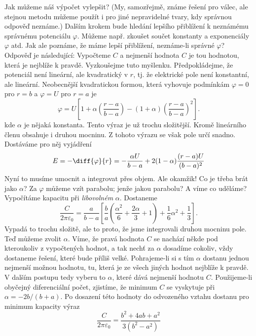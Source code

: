    Jak můžeme náš výpočet vylepšit? (My, samozřejmě, známe řešení pro válec, ale stejnou metodu
    můžeme použít i pro jiné nepravidelné tvary, kdy správnou odpověď neznáme.) Dalším krokem bude
    hledání lepšího přiblížení k neznámému správnému potenciálu \(\varphi\). Můžeme např. zkoušet
    součet konstanty a exponenciály \(\varphi\) atd. Jak ale poznáme, že máme lepší přiblížení,
    neznáme-li správné \(\varphi\)? Odpověď je následující: Vypočteme \(C\) a nejmenší hodnota \(C\)
    je tou hodnotou, která je nejblíže k pravdě. Vyzkoušejme tuto myšlenku. Předpokládejme, že
    potenciál není lineární, ale kvadratický v \(r\), tj. že elektrické pole není konstantní, ale
    lineární. Neobecnější kvadratickou formou, která vyhovuje podmínkám \(\varphi = 0\) pro \(r=b\)
    a \(\varphi=U\) pro \(r=a\) je
    \begin{equation*}
      \varphi = U\left[1 + \alpha \left(\dfrac{r-a}{b-a}\right) 
                    - (1 + \alpha)\left(\dfrac{r-a}{b-a}\right)^2\right].
    \end{equation*}
    kde \(\alpha\) je nějaká konstanta. Tento výraz je už trochu složitější. Kromě lineárního členu
    obsahuje i druhou mocninu. Z tohoto výrazu se však pole určí snadno. Dostáváme pro něj vyjádření
    \begin{equation*}
      E = -\diff{\varphi}{r} = - \dfrac{\alpha U}{b-a} + 2(1 - \alpha)\dfrac{(r-a)U}{(b-a)^2}
    \end{equation*}
    Nyní to musíme umocnit a integrovat přes objem. Ale okamžik! Co je třeba brát jako \(\alpha\)?
    Za \(\varphi\) můžeme vzít parabolu; jenže jakou parabolu? A víme co uděláme? Vypočítáme
    kapacitu při \emph{libovolném} \(\alpha\). Dostaneme
    \begin{equation*}
      \dfrac{C}{2\pi\varepsilon_0} = 
      \dfrac{a}{b-a}\left[
          \dfrac{b}{a}\left(\dfrac{\alpha^2}{6}+\dfrac{2\alpha}{3}+1\right) + 
          \dfrac{1}{6}\alpha^2+\dfrac{1}{3}
      \right].
    \end{equation*}
    Vypadá to trochu složitě, ale to proto, že jsme integrovali druhou mocninu pole. Teď můžeme
    zvolit \(\alpha\). Víme, že pravá hodnota \(C\) se nachází někde pod kteroukoliv z vypočtených
    hodnot, a tak nechť za \(\alpha\) dosadíme cokoliv, vždy dostaneme řešení, které bude příliš
    velké. Pohrajeme-li si s tím \(\alpha\) dostanu jednou nejmenší možnou hodnotu, tu, která je ze
    všech jiných hodnot nejblíže k pravdě. V dalším postupu tedy vyberu to \(\alpha\), které dává
    nejmenší hodnotu \(C\). Použijeme-li obyčejný diferenciální počet, zjistíme, že minimum \(C\) se
    vyskytuje při \(\alpha = - 2 b/(b + a)\). Po dosazení této hodnoty do odvozeného vztahu dostanu
    pro minimum kapacity výraz
    \begin{equation*}
      \dfrac{C}{2\pi\varepsilon_0} = \dfrac{b^2 + 4ab + a^2}{3(b^2 - a^2)}
    \end{equation*}

